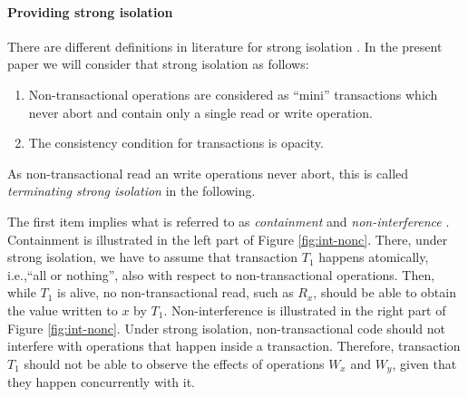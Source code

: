 \documentclass[11pt,letterpaper]{article}
\begin{document}
\paragraph{Providing strong isolation}
There  are different  definitions in  literature for  strong 
isolation \cite{blundell06, harris06, maessen07}.  
In the present  paper we  will consider that strong isolation as  follows:  
\begin{enumerate}
\vspace{-0.1cm}
\item   Non-transactional   operations   are   considered   as ``mini''
transactions which never abort and  contain only a single  read or 
write operation. 
\vspace{-0.2cm}
\item The consistency condition for transactions is opacity.
\end{enumerate}
As non-transactional read an write operations never abort, 
this is called {\it terminating strong isolation} in the following.





The  first   item   implies   what   is  referred  to  as  
{\it containment}  and
{\it non-interference} \cite{blundell06}.  
Containment is   illustrated in  the  left  part of  Figure
\ref{fig:int-nonc}.  There,
under strong  isolation, we have  to assume that transaction  $T_1$ happens
atomically,  
i.e.,``all  or  nothing'',   also  with  respect  to  non-transactional
operations. Then, while $T_1$ is  alive, no non-transactional read, such as
$R_x$, should be  
able to obtain  the value written to $x$  by $T_1$. Non-interference
is  illustrated  in  the right part of Figure  \ref{fig:int-nonc}.  
Under  strong  isolation, non-transactional  
code   should  not  interfere   with  operations   that  happen   inside  a
transaction. Therefore, transaction $T_1$ should not be able to observe the
effects of  
operations $W_x$ and $W_y$, given that they happen concurrently with it. 

\begin{figure*}[h]
\centerline{
}
\caption{Left:  {\it Containment}  (operation $R_x$  should not  return the
    value written to $x$ inside the transaction). 
Right:  {\it  Non-Interference} (wile  it is still  executing, transaction
$T_1$ should not have access to the values that were written to $x$ and $y$
by process $p_2$).} 
\label{fig:int-nonc}
\end{figure*}
\end{document}
